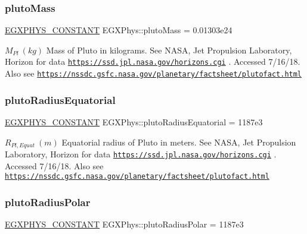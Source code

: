 \subsubsection{\texorpdfstring{pluto\+Mass}{plutoMass}}
{\footnotesize\ttfamily \mbox{\hyperlink{group___e_g_x_phys-_constants-_macros_ga76980d288494ce1714c9ac68a95ba702}{E\+G\+X\+P\+H\+Y\+S\+\_\+\+C\+O\+N\+S\+T\+A\+NT}} E\+G\+X\+Phys\+::pluto\+Mass = 0.\+01303e24}

$M_{Pl} \ (kg)$ Mass of Pluto in kilograms. See N\+A\+SA, Jet Propulsion Laboratory, Horizon for data \href{https://ssd.jpl.nasa.gov/horizons.cgi}{\tt https\+://ssd.\+jpl.\+nasa.\+gov/horizons.\+cgi} . Accessed 7/16/18. Also see \href{https://nssdc.gsfc.nasa.gov/planetary/factsheet/plutofact.html}{\tt https\+://nssdc.\+gsfc.\+nasa.\+gov/planetary/factsheet/plutofact.\+html} \mbox{\label{group___e_g_x_phys-_constants-_astrophysics-_solar_system-_pluto-_bulk_gaf4f1a1a2beece69e57a7e7e81e20d732}} 
\subsubsection{\texorpdfstring{pluto\+Radius\+Equatorial}{plutoRadiusEquatorial}}
{\footnotesize\ttfamily \mbox{\hyperlink{group___e_g_x_phys-_constants-_macros_ga76980d288494ce1714c9ac68a95ba702}{E\+G\+X\+P\+H\+Y\+S\+\_\+\+C\+O\+N\+S\+T\+A\+NT}} E\+G\+X\+Phys\+::pluto\+Radius\+Equatorial = 1187e3}

$R_{Pl,Equat} \ (m)$ Equatorial radius of Pluto in meters. See N\+A\+SA, Jet Propulsion Laboratory, Horizon for data \href{https://ssd.jpl.nasa.gov/horizons.cgi}{\tt https\+://ssd.\+jpl.\+nasa.\+gov/horizons.\+cgi} . Accessed 7/16/18. Also see \href{https://nssdc.gsfc.nasa.gov/planetary/factsheet/plutofact.html}{\tt https\+://nssdc.\+gsfc.\+nasa.\+gov/planetary/factsheet/plutofact.\+html} \mbox{\label{group___e_g_x_phys-_constants-_astrophysics-_solar_system-_pluto-_bulk_gadefd01a34e2911eb76f9e42c4878669a}} 
\subsubsection{\texorpdfstring{pluto\+Radius\+Polar}{plutoRadiusPolar}}
{\footnotesize\ttfamily \mbox{\hyperlink{group___e_g_x_phys-_constants-_macros_ga76980d288494ce1714c9ac68a95ba702}{E\+G\+X\+P\+H\+Y\+S\+\_\+\+C\+O\+N\+S\+T\+A\+NT}} E\+G\+X\+Phys\+::pluto\+Radius\+Polar = 1187e3}

